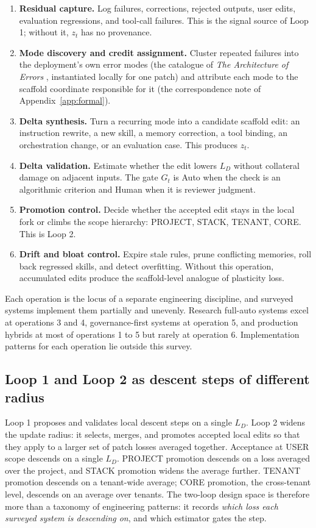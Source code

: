 \documentclass[
  11pt,
]{article}
\providecommand{\tightlist}{%
  \setlength{\itemsep}{0pt}\setlength{\parskip}{0pt}}
\begin{document}
\begin{enumerate}
\def\labelenumi{\arabic{enumi}.}
\tightlist
\item
  \textbf{Residual capture.} Log failures, corrections, rejected outputs, user edits, evaluation regressions, and tool-call failures. This is the signal source of Loop 1; without it, \(z_t\) has no provenance.
\item
  \textbf{Mode discovery and credit assignment.} Cluster repeated failures into the deployment's own error modes (the catalogue of \emph{The Architecture of Errors} \cite{arbuzov2026architecture}, instantiated locally for one patch) and attribute each mode to the scaffold coordinate responsible for it (the correspondence note of Appendix~\ref{app:formal}).
\item
  \textbf{Delta synthesis.} Turn a recurring mode into a candidate scaffold edit: an instruction rewrite, a new skill, a memory correction, a tool binding, an orchestration change, or an evaluation case. This produces \(z_t\).
\item
  \textbf{Delta validation.} Estimate whether the edit lowers \(L_D\) without collateral damage on adjacent inputs. The gate \(G_t\) is Auto when the check is an algorithmic criterion and Human when it is reviewer judgment.
\item
  \textbf{Promotion control.} Decide whether the accepted edit stays in the local fork or climbs the scope hierarchy: PROJECT, STACK, TENANT, CORE. This is Loop 2.
\item
  \textbf{Drift and bloat control.} Expire stale rules, prune conflicting memories, roll back regressed skills, and detect overfitting. Without this operation, accumulated edits produce the scaffold-level analogue of plasticity loss.
\end{enumerate}

Each operation is the locus of a separate engineering discipline, and surveyed systems implement them partially and unevenly. Research full-auto systems excel at operations 3 and 4, governance-first systems at operation 5, and production hybrids at most of operations 1 to 5 but rarely at operation 6. Implementation patterns for each operation lie outside this survey.

\subsection{Loop 1 and Loop 2 as descent steps of different radius}\label{app:mechanism-2}

Loop 1 proposes and validates local descent steps on a single \(L_D\). Loop 2 widens the update radius: it selects, merges, and promotes accepted local edits so that they apply to a larger set of patch losses averaged together. Acceptance at USER scope descends on a single \(L_D\). PROJECT promotion descends on a loss averaged over the project, and STACK promotion widens the average further. TENANT promotion descends on a tenant-wide average; CORE promotion, the cross-tenant level, descends on an average over tenants. The two-loop design space is therefore more than a taxonomy of engineering patterns: it records \emph{which loss each surveyed system is descending on}, and which estimator gates the step.
\end{document}
